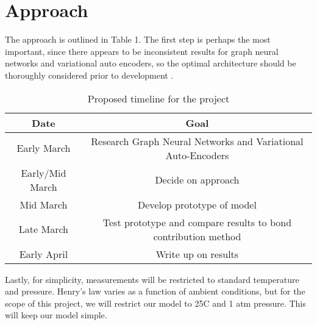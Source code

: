 \documentclass[12pt, oneside]{article}   	%
\begin{document}
\section{Approach}
The approach is outlined in Table 1. The first step is perhaps the most important, since there appears to be inconsistent results for graph neural networks and variational auto encoders, so the optimal architecture should be thoroughly considered prior to development \cite{RN118}.
\begin{table}[!h]
   \centering
   \caption{Proposed timeline for the project}
   \begin{tabular}{| c | c |}
   	\hline
         Date & Goal \\
	\hline
	Early March & Research Graph Neural Networks and Variational Auto-Encoders \\
	Early/Mid March & Decide on approach \\
	Mid March & Develop prototype of model \\
	Late March & Test prototype and compare results to bond contribution method \\
	Early April & Write up on results\\
	\hline
   \end{tabular}
   \label{tab:timeline}
\end{table}

Lastly, for simplicity, measurements will be restricted to standard temperature and pressure. Henry's law varies as a function of ambient conditions, but for the scope of this project, we will restrict our model to 25\textdegree C and 1 atm pressure. This will keep our model simple.

{}

\end{document}
